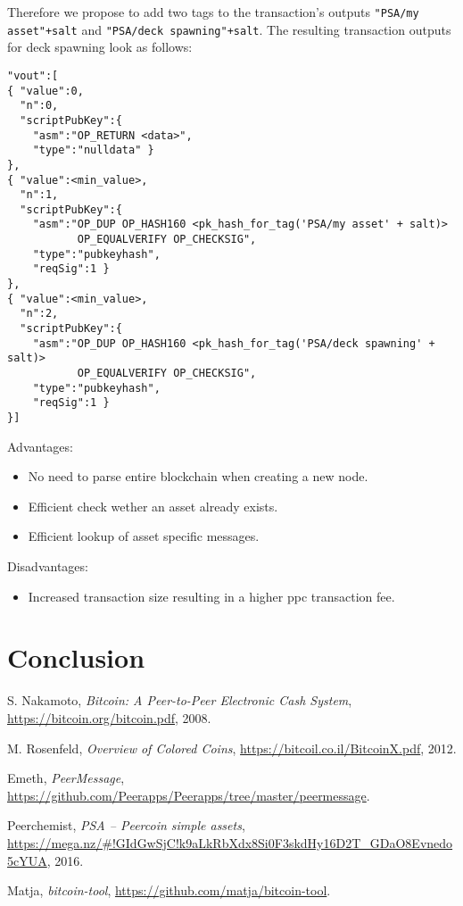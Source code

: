 \documentclass[a4paper,10pt]{article}
\begin{document}
Therefore we propose to add two tags to the transaction's outputs \verb|"PSA/my asset"+salt| and \verb|"PSA/deck spawning"+salt|.
The resulting transaction outputs for deck spawning look as follows:
\begin{verbatim}
"vout":[
{ "value":0,
  "n":0,
  "scriptPubKey":{
    "asm":"OP_RETURN <data>",
    "type":"nulldata" }
},
{ "value":<min_value>,
  "n":1,
  "scriptPubKey":{
    "asm":"OP_DUP OP_HASH160 <pk_hash_for_tag('PSA/my asset' + salt)>
           OP_EQUALVERIFY OP_CHECKSIG",
    "type":"pubkeyhash",
    "reqSig":1 }
},
{ "value":<min_value>,
  "n":2,
  "scriptPubKey":{
    "asm":"OP_DUP OP_HASH160 <pk_hash_for_tag('PSA/deck spawning' + salt)>
           OP_EQUALVERIFY OP_CHECKSIG",
    "type":"pubkeyhash",
    "reqSig":1 }
}]
\end{verbatim}



Advantages:
\begin{itemize}
 \item No need to parse entire blockchain when creating a new node.
 \item Efficient check wether an asset already exists.
 \item Efficient lookup of asset specific messages.
\end{itemize}

Disadvantages:
\begin{itemize}
 \item Increased transaction size resulting in a higher ppc transaction fee.
\end{itemize}

\section{Conclusion}


\begin{thebibliography}{9}

  S. Nakamoto,
  \emph{Bitcoin: A Peer-to-Peer Electronic Cash System},
  \url{https://bitcoin.org/bitcoin.pdf},
  2008.

  M. Rosenfeld,
  \emph{Overview of Colored Coins},
  \url{https://bitcoil.co.il/BitcoinX.pdf},
  2012.

  Emeth,
  \emph{PeerMessage},
  \url{https://github.com/Peerapps/Peerapps/tree/master/peermessage}.

  Peerchemist,
  \emph{PSA – Peercoin simple assets},
  \url{https://mega.nz/#!GIdGwSjC!k9aLkRbXdx8Si0F3skdHy16D2T_GDaO8Evnedo5cYUA},
  2016.

  Matja,
  \emph{bitcoin-tool},
  \url{https://github.com/matja/bitcoin-tool}.

\end{thebibliography}
\end{document}

